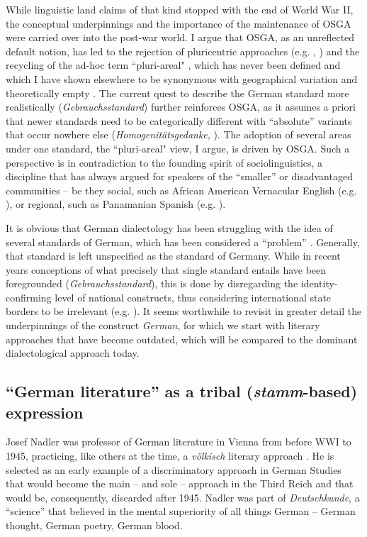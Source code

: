 \documentclass[output=paper]{langscibook}
\begin{document}
While linguistic land claims of that kind stopped with the end of World War II, the conceptual underpinnings and the importance of the maintenance of OSGA were carried over into the post-war world. I argue that OSGA, as an unreflected default notion, has led to the rejection of pluricentric approaches (e.g. \citealt[72--73]{ElspaßEtAl2017}, \citealt[564]{DürscheidElspaß2015,Glauninger2013}) and the recycling of the ad-hoc term ``pluri-areal" \citep{Wolf1994}, which has never been defined and which I have shown elsewhere to be synonymous with geographical variation and theoretically empty \citep[62--64]{Dollinger2019c}. The current quest to describe the German standard more realistically (\textit{Gebrauchsstandard}) further reinforces OSGA, as it assumes a priori that newer standards need to be categorically different with “absolute” variants that occur nowhere else (\textit{Homogenitätsgedanke}, \citealt[72]{ElspaßEtAl2017}). The adoption of several areas under one standard, the ``pluri-areal" view, I argue, is driven by OSGA. Such a perspective is in contradiction to the founding spirit of sociolinguistics, a discipline that has always argued for speakers of the “smaller” or disadvantaged communities -- be they social, such as African American Vernacular English (e.g. \citealt{Wolfram1969}), or regional, such as Panamanian Spanish (e.g. \citealt{Cedergren1973}).

It is obvious that German dialectology has been struggling with the idea of several standards of German, which has been considered a “problem” \citep{Ammon1995}. Generally, that standard is left unspecified as the standard of Germany. While in recent years conceptions of what precisely that single standard entails have been foregrounded (\textit{Gebrauchsstandard}), this is done by disregarding the identity-confirming level of national constructs, thus considering international state borders to be irrelevant (e.g. \citealt{DürscheidElspaß2015}). It seems worthwhile to revisit in greater detail the underpinnings of the construct \textit{German}, for which we start with literary approaches that have become outdated, which will be compared to the dominant dialectological approach today.

\subsection{“German literature” as a tribal (\textit{stamm}-based) expression}\label{sec:dollinger:2.1}

Josef Nadler was professor of German literature in Vienna from before WWI to 1945, practicing, like others at the time, a \textit{völkisch} literary approach \citep{Ranzmaier2008}. He is selected as an
early example of a discriminatory approach in German Studies that would become the main – and sole – approach in the Third Reich and that would be, consequently, discarded after 1945. Nadler was part of \textit{Deutschkunde}, a “science” that believed in the mental superiority of all things German -- German thought, German poetry, German blood.
\end{document}
